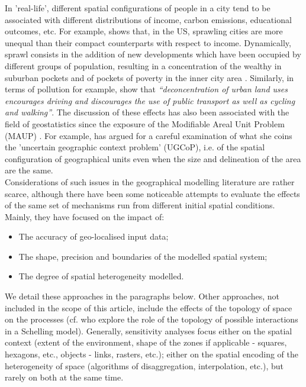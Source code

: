 \documentclass[3p,times,procedia]{elsarticle}
\begin{document}
In 'real-life', different spatial configurations of people in a city tend to be associated with different distributions of income, carbon emissions, educational outcomes, etc. For example, \citet{wheeler2006urban} shows that, in the US, sprawling cities are more unequal than their compact counterparts with respect to income. Dynamically, sprawl consists in the addition of new developments which have been occupied by different groups of population, resulting in a concentration of the wealthy in suburban pockets and of pockets of poverty in the inner city area \citep{jargowsky2002sprawl}. Similarly, in terms of pollution for example, \citet[p.173]{schwanen2001travel} show that \textit{``deconcentration of urban land uses encourages driving and discourages the use of public transport as well as cycling and walking''}. The discussion of these effects has also been associated with the field of geostatistics since the exposure of the Modifiable Areal Unit Problem (MAUP) \citep{Openshaw1984, FotheringhamWong1991}. For example, \citet{Kwan2012} has argued for a careful examination of what she coins the 'uncertain geographic context problem' (UGCoP), i.e. of the spatial configuration of geographical units even when the size and delineation of the area are the same.\\

Considerations of such issues in the geographical modelling literature are rather scarce, although there have been some noticeable attempts to evaluate the effects of the same set of mechanisms run from different initial spatial conditions. Mainly, they have focused on the impact of:
\begin{itemize}
\item The accuracy of geo-localised input data;
\item The shape, precision and boundaries of the modelled spatial system;
\item The degree of spatial heterogeneity modelled.
\end{itemize}
We detail these approaches in the paragraphs below. Other approaches, not included in the scope of this article, include the effects of the topology of space on the processes (cf. \citet{moreno2009integrating} who explore the role of the topology of possible interactions in a Schelling model). Generally, sensitivity analyses focus either on the spatial context (extent of the environment, shape of the zones if applicable - squares, hexagons, etc., objects - links, rasters, etc.); either on the spatial encoding of the heterogeneity of space (algorithms of disaggregation, interpolation, etc.), but rarely on both at the same time.
\end{document}
